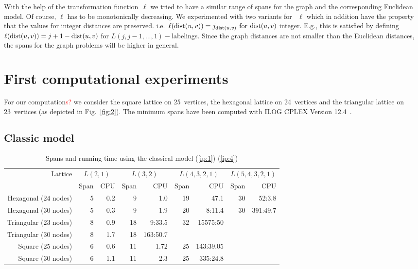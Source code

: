 \documentclass[smallextended]{svjour3}
\def\dist{\mathop{\rm dist}}
\newcommand\ToDo[1]{\textcolor{red}{#1}}
\begin{document}
With the help of the transformation function~$\ell$ we tried to have a similar
range of spans for the graph and the corresponding Euclidean model.
Of course, $\ell$ has to be monotonically decreasing. We experimented with
two variants for ~$\ell$ which in addition have the property that the values for
integer distances are preserved. i.e.\ $\ell(\dist(u,v))=j_{\dist(u,v)}$ for $\dist(u,v)$ integer.
E.g., this is satisfied by defining $\ell(\dist(u,v))=j+1-\dist(u,v)$ for
$L(j,j-1,\ldots ,1)-$labelings.
Since the graph distances are not smaller than the Euclidean distances, the
spans for the graph problems will be higher in general.

\section{First computational experiments}

For our computation\ToDo{s?} we consider the square lattice on 25~vertices, the hexagonal
lattice on 24~vertices and the triangular lattice on 23~vertices (as depicted in Fig.~\ref{fig:2}).
The minimum spans have been computed with ILOG CPLEX Version 12.4~\cite{Cpl15}. 

\subsection{Classic model}

\begin{table}[h]
\centering

\begin{tabular}{|r||r|r|r|r|r|r|r|r|}
\hline 
Lattice  & \multicolumn{2}{c|}{$L(2,1)$} & \multicolumn{2}{c|}{$L(3,2)$} & \multicolumn{2}{c|}{$L(4,3,2,1)$} & \multicolumn{2}{c|}{$L(5,4,3,2,1)$}\\
         & Span & CPU & Span & CPU & Span & CPU & Span & CPU \\
\hline 
Hexagonal ($24$ nodes)  & 5 & 0.2 & 9 & 1.0 & 19 & 47.1 & 30 & 52:3.8 \\
\hline
Hexagonal ($30$ nodes)  & 5 & 0.3 & 9 & 1.9 & 20 & 8:11.4 & 30 & 391:49.7 \\
\hline
Triangular ($23$ nodes) & 8 & 0.9 & 18 & 9:33.5 & 32 & 15575:50 & & \\
\hline
Triangular ($30$ nodes) & 8 & 1.7 & 18 & 163:50.7 &  &  &  &    \\
\hline 
Square ($25$ nodes)    & 6 & 0.6 & 11 & 1.72 & 25 & 143:39.05 & & \\
\hline
Square ($30$ nodes)    & 6 & 1.1 & 11 & 2.3 & 25 & 335:24.8 &  &    \\
\hline 
\end{tabular}
\caption{ Spans and running time using the classical model (\ref{ip:1})-(\ref{ip:4})} 
\label{tab:00}
\end{table}
\end{document}
